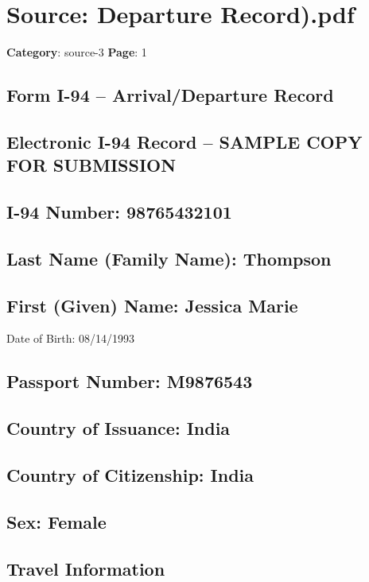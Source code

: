 \section*{Source: Departure Record).pdf}
\textbf{Category}: source-3
\textbf{Page}: 1

\subsection*{Form I-94 – Arrival/Departure Record}

\subsection*{Electronic I-94 Record – SAMPLE COPY FOR SUBMISSION}

\subsection*{I-94 Number: 98765432101}

\subsection*{Last Name (Family Name): Thompson}

\subsection*{First (Given) Name: Jessica Marie}

Date of Birth: 08/14/1993

\subsection*{Passport Number: M9876543}

\subsection*{Country of Issuance: India}

\subsection*{Country of Citizenship: India}

\subsection*{Sex: Female}

\subsection*{Travel Information}

